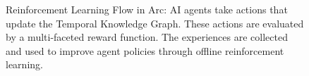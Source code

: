 \begin{figure}[H]
{\begin{tikzpicture}
  \end{tikzpicture}
  }
  \caption{Reinforcement Learning Flow in Arc: AI agents take actions that update the Temporal Knowledge Graph. These actions are evaluated by a multi-faceted reward function. The experiences are collected and used to improve agent policies through offline reinforcement learning.}
  \label{fig:rl_flow}
\end{figure}
